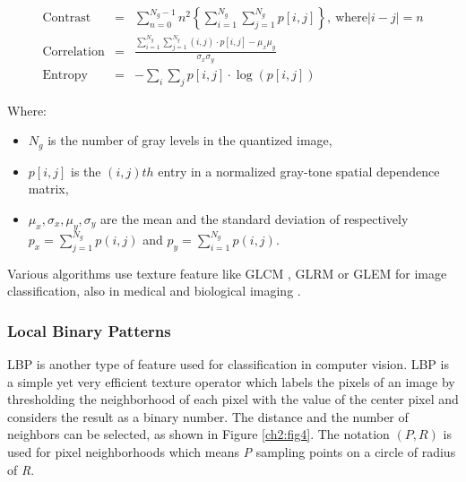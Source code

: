 \begin{eqnarray}
\textrm{Contrast} & = & \sum_{n=0}^{N_g-1} n^{2} \left\{ \sum_{i=1}^{N_g} \sum_{j=1}^{N_g} p[i,j] \right\}, \ \textrm{where} |i-j| = n \\
\textrm{Correlation} & = & \frac{ \sum_{i=1}^{N_g} \sum_{j=1}^{N_g} (i,j) \cdot p[i,j] - \mu_x \mu_y }{\sigma_x \sigma_y} \\
\textrm{Entropy} & = & - \sum_{i} \sum_{j} p[i,j] \cdot \log(p[i,j])
\end{eqnarray}

Where:
\begin{itemize}
 \item $N_g$ is the number of gray levels in the quantized image,
 \item $p[i,j]$ is the $(i,j)th$ entry in a normalized gray-tone spatial dependence matrix,
 \item $\mu_x,\sigma_x,\mu_y,\sigma_y$ are the mean and the standard deviation of respectively $p_x = \sum_{j=1}^{N_g}p(i,j)$ and  $p_y = \sum_{i=1}^{N_g}p(i,j)$.
\end{itemize}

Various algorithms use texture feature like \Gls{GLCM} \cite{texture03}, \Gls{GLRM} \cite{texture02} or \Gls{GLEM} for image classification,
also in medical \cite{texture04} and biological imaging \cite{textGLCMbiol}.


\subsubsection{Local Binary Patterns}

\Gls{LBP} is another type of feature used for classification in computer vision. \Gls{LBP} is a simple yet very efficient texture operator
which labels the pixels of an image by thresholding the neighborhood of each pixel with the value of the center pixel and considers the result as a binary number.
The distance and the number of neighbors can be selected, as shown in Figure \ref{ch2:fig4}\cite{LBP01}.
The notation $(P,R)$ is used for pixel neighborhoods which means \textit{P} sampling points on a circle of radius of \textit{R}.

